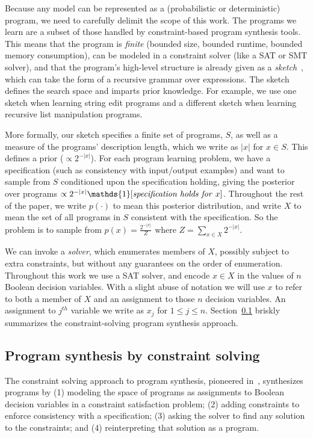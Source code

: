 \documentclass{article}
\begin{document}
Because any model can be represented as a (probabilistic or deterministic) program,
we need to carefully delimit
the scope of this work.
The programs we learn are a subset of those handled by constraint-based program synthesis tools.
This means that the program is \emph{finite} (bounded size, bounded runtime, bounded memory consumption),
can be modeled in a constraint solver (like a SAT or SMT solver),
and that the program's high-level structure is already given as a \emph{sketch}~\cite{solar2008program},
which can take the form of a recursive grammar over expressions.
The sketch defines the search space and imparts prior knowledge.
For example,
we use one sketch when learning string edit programs and a different sketch when learning recursive list manipulation programs.

More formally, our sketch specifies a finite set of programs, $S$,
as well as a measure of the programs' description length,
which we write as $\lvert x \rvert$ for $x\in S$.
This defines a prior ($\propto 2^{- \lvert x \rvert }$).
For each program learning problem,
we have a specification (such as consistency with input/output examples)
and want to sample from $S$ conditioned upon the specification holding,
giving the posterior over programs $\propto 2^{- \lvert x \rvert } \mathds{1}[\text{\emph{specification holds for} }x]$.
Throughout the rest of the paper, we write $p(\cdot )$ to mean this posterior distribution, and write $X$ to mean the set of all  programs in $S$  consistent with the specification.
So the problem is to sample from $p(x) = \frac{2^{-|x|}}{Z} \text{ where } Z = \sum_{x\in X} 2^{-|x|}$.

We can invoke a \emph{solver}, which enumerates members of $X$,
possibly subject to extra constraints, but without any guarantees on
the order of enumeration.  Throughout this work we use a SAT solver,
and encode $x\in X$ in the values of $n$ Boolean decision variables.
With a slight abuse of notation we will use $x$ to refer to both a
member of $X$ and an assignment to those $n$ decision variables.  An
assignment to $j^{th}$ variable we write as $x_j$ for $1\leq j\leq n$.
Section~\ref{brisk} briskly summarizes the constraint-solving program synthesis approach.

\subsection{Program synthesis by constraint solving}\label{brisk}
The constraint solving approach to program synthesis, pioneered
in~\cite{solar2008program,jha2010oracle},
synthesizes programs by (1) modeling the space of programs as
assignments to Boolean decision variables in a constraint satisfaction
problem; (2) adding constraints to enforce consistency with a
specification; (3) asking the solver to find any solution to the
constraints; and (4) reinterpreting that solution as a program.
\end{document}

